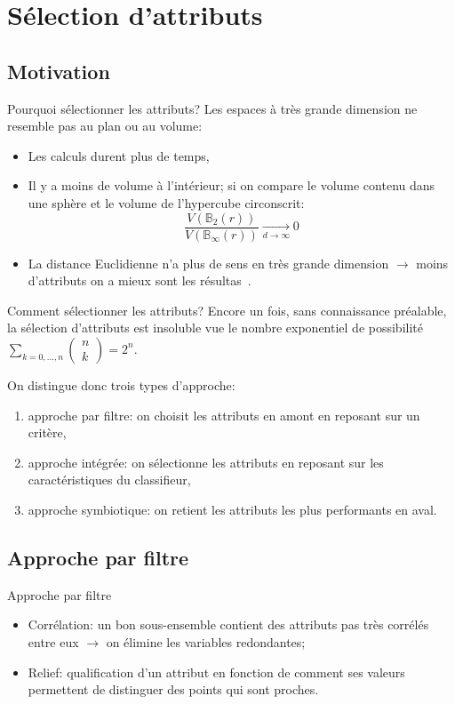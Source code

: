 \documentclass[8pt]{beamer}
\begin{document}
	\section[feature selection]{Sélection d'attributs}
	\subsection[motivation]{Motivation}
	\begin{frame}{Pourquoi sélectionner les attributs?}
		Les espaces à très grande dimension ne resemble pas au plan ou au volume:
		\begin{itemize}
			\item <1-> Les calculs durent plus de temps,
			\item <2-> Il y a moins de volume à l'intérieur; si on compare le volume contenu dans une sphère et le volume de l'hypercube circonscrit:
			$$\frac{V(\mathbb{B}_{2}(r))}{V(\mathbb{B}_{\infty}(r))}\xrightarrow[d \to \infty]{} 0$$
			\item <3-> La distance Euclidienne n'a plus de sens en très grande dimension $\longrightarrow$ moins d'attributs on a mieux sont les résultas~\cite{Domingos:2012:FUT:2347736.2347755}.
		\end{itemize}
	\end{frame}

	\begin{frame}{Comment sélectionner les attributs?}
		Encore un fois, sans connaissance préalable, la sélection d'attributs est insoluble vue le nombre exponentiel de possibilité $\sum_{k=0,\dots,n} \begin{pmatrix}
		n\\
		k
		\end{pmatrix} = 2^n$.

		On distingue donc trois types d'approche:
		\begin{enumerate}
			\item<1-> approche par filtre: on choisit les attributs en amont en reposant sur un critère,
			\item<2-> approche intégrée: on sélectionne les attributs en reposant sur les caractéristiques du classifieur,
			\item<3-> approche symbiotique: on retient les attributs les plus performants en aval.
		\end{enumerate}
	\end{frame}

	\subsection[filter approach]{Approche par filtre}
	\begin{frame}{Approche par filtre}
		\begin{itemize}
			\item  Corrélation: un bon sous-ensemble contient des attributs pas très corrélés entre eux $\longrightarrow$ on élimine les variables redondantes;
			\item  Relief: qualification d'un attribut en fonction de comment ses valeurs permettent de distinguer des points qui sont proches.
		\end{itemize}
	\end{frame}
\end{document}
